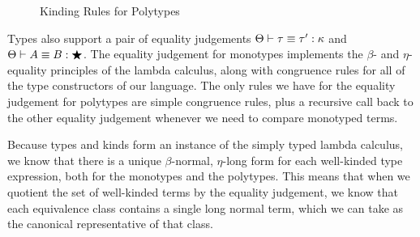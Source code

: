 \begin{figure}[h]
\caption{Kinding Rules for Polytypes}
\label{polytype-kinding}
\end{figure}


Types also support a pair of equality judgements
${\Theta} \vdash {\tau} \equiv {\tau'} : {\kappa}$ and ${\Theta} \vdash {A} \equiv {B} : {\bigstar}$.  The
equality judgement for monotypes implements the $\beta$- and
$\eta$-equality principles of the lambda calculus, along with
congruence rules for all of the type constructors of our language.
The only rules we have for the equality judgement for polytypes are
simple congruence rules, plus a recursive call back to the other
equality judgement whenever we need to compare monotyped terms.

Because types and kinds form an instance of the simply typed lambda
calculus, we know that there is a unique $\beta$-normal, $\eta$-long
form for each well-kinded type expression, both for the monotypes and
the polytypes. This means that when we quotient the set of well-kinded
terms by the equality judgement, we know that each equivalence class
contains a single long normal term, which we can take as the canonical
representative of that class.


